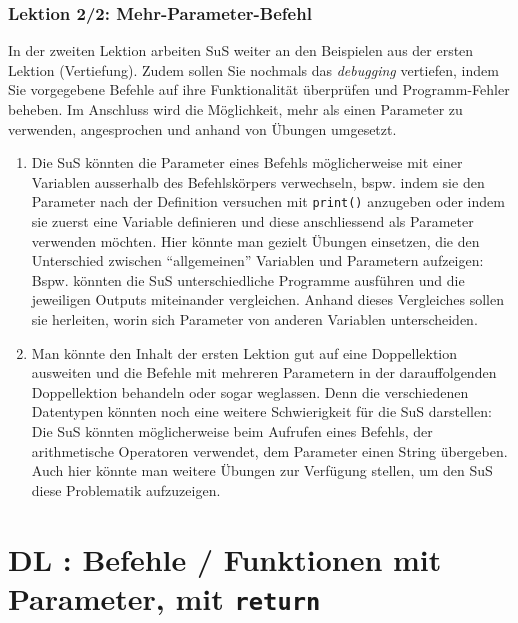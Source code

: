 \begin{myExBox}[title=DL \themycounter]
\subsubsection*{Lektion 2/2: Mehr-Parameter-Befehl}
In der zweiten Lektion arbeiten SuS weiter an den Beispielen aus der ersten Lektion (Vertiefung). Zudem sollen Sie nochmals das \textit{debugging} vertiefen, indem Sie vorgegebene Befehle auf ihre Funktionalität überprüfen und Programm-Fehler beheben. Im Anschluss wird die Möglichkeit, mehr als einen Parameter zu verwenden, angesprochen und anhand von Übungen umgesetzt.

\begin{myExBox}[title=Mögliche Schwierigkeiten \& geeignete Massnahmen]
\begin{enumerate}
    \item Die SuS könnten die Parameter eines Befehls möglicherweise mit einer Variablen ausserhalb des Befehlskörpers verwechseln, bspw. indem sie den Parameter nach der Definition versuchen mit \lstinline|print()| anzugeben oder indem sie zuerst eine Variable definieren und diese anschliessend als Parameter verwenden möchten. Hier könnte man gezielt Übungen einsetzen, die den Unterschied zwischen ``allgemeinen'' Variablen und Parametern aufzeigen: Bspw. könnten die SuS unterschiedliche Programme ausführen und die jeweiligen Outputs miteinander vergleichen. Anhand dieses Vergleiches sollen sie herleiten, worin sich Parameter von anderen Variablen unterscheiden.
    \item Man könnte den Inhalt der ersten Lektion gut auf eine Doppellektion ausweiten und die Befehle mit mehreren Parametern in der darauffolgenden Doppellektion behandeln oder sogar weglassen. Denn die verschiedenen Datentypen könnten noch eine weitere Schwierigkeit für die SuS darstellen: Die SuS könnten möglicherweise beim Aufrufen eines Befehls, der arithmetische Operatoren verwendet, dem Parameter einen String übergeben. Auch hier könnte man weitere Übungen zur Verfügung stellen, um den SuS diese Problematik aufzuzeigen.
\end{enumerate}
\end{myExBox}
\end{myExBox}
\newpage{}

\section{DL \themycounter: Befehle / Funktionen mit Parameter, mit \texorpdfstring{\lstinline|return|}{return}}

